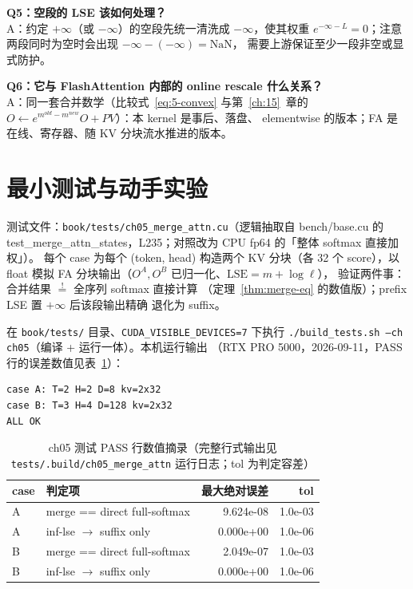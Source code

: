 \textbf{Q5：空段的 LSE 该如何处理？}\\
A：约定 $+\infty$（或 $-\infty$）的空段先统一清洗成 $-\infty$，使其权重
$e^{-\infty - L} = 0$；注意两段同时为空时会出现 $-\infty - (-\infty) = \mathrm{NaN}$，
需要上游保证至少一段非空或显式防护。

\textbf{Q6：它与 FlashAttention 内部的 online rescale 什么关系？}\\
A：同一套合并数学（比较式~\ref{eq:5-convex} 与第~\ref{ch:15}~章的
$O \leftarrow e^{m^{old} - m^{new}} O + PV$）：本 kernel 是事后、落盘、
elementwise 的版本；FA 是在线、寄存器、随 KV 分块流水推进的版本。

\section{最小测试与动手实验}

测试文件：\texttt{book/\allowbreak{}tests/\allowbreak{}ch05\_\allowbreak{}merge\_\allowbreak{}attn.cu}（逻辑抽取自 bench/base.cu 的
test\_merge\_attn\_states，L235；对照改为 CPU fp64 的「整体 softmax 直接加权」）。
每个 case 为每个 (token, head) 构造两个 KV 分块（各 32 个 score），以 float 模拟
FA 分块输出（$O^{A}, O^{B}$ 已归一化、$\mathrm{LSE} = m + \log \ell$），
验证两件事：合并结果 $\stackrel{!}{=}$ 全序列 softmax 直接计算
（定理~\ref{thm:merge-eq} 的数值版）；prefix LSE 置 $+\infty$ 后该段输出精确
退化为 suffix。

在 \texttt{book/tests/} 目录、\texttt{CUDA\_\allowbreak{}VISIBLE\_\allowbreak{}DEVICES=\allowbreak{}7} 下执行
\texttt{.\allowbreak{}/\allowbreak{}build\_\allowbreak{}tests.\allowbreak{}sh --ch ch05}（编译 + 运行一体）。本机运行输出
（RTX PRO 5000，2026-09-11，PASS 行的误差数值见表~\ref{tab:5-pass}）：

\begin{lstlisting}[style=console]
case A: T=2 H=2 D=8 kv=2x32
case B: T=3 H=4 D=128 kv=2x32
ALL OK
\end{lstlisting}

\begin{table}[htbp]
\centering
\caption{ch05 测试 PASS 行数值摘录（完整行式输出见
\texttt{tests/\allowbreak{}.build/\allowbreak{}ch05\_\allowbreak{}merge\_\allowbreak{}attn} 运行日志；tol 为判定容差）}
\label{tab:5-pass}
\begin{tabular}{llrr}
\toprule
case & 判定项 & 最大绝对误差 & tol \\
\midrule
A & merge == direct full-softmax & 9.624e-08 & 1.0e-03 \\
A & inf-lse $\to$ suffix only    & 0.000e+00 & 1.0e-06 \\
B & merge == direct full-softmax & 2.049e-07 & 1.0e-03 \\
B & inf-lse $\to$ suffix only    & 0.000e+00 & 1.0e-06 \\
\bottomrule
\end{tabular}
\end{table}


